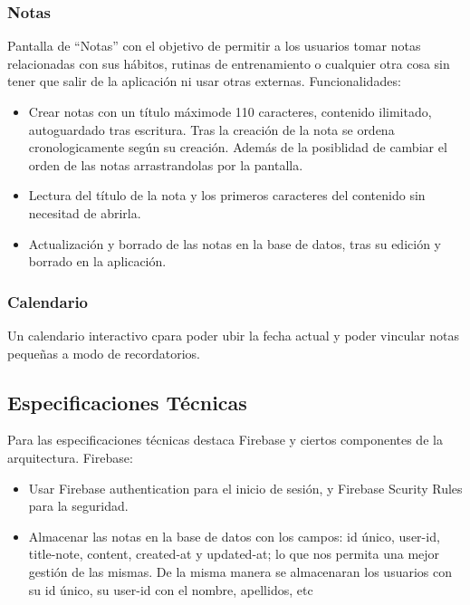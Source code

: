 \subsubsection{Notas}
Pantalla de ``Notas'' con el objetivo de permitir a los usuarios tomar notas relacionadas con sus hábitos, rutinas de entrenamiento o cualquier otra cosa sin tener que salir de la aplicación ni usar otras externas.
Funcionalidades:
\begin{itemize}
    \item Crear notas con un título máximode 110 caracteres, contenido ilimitado, autoguardado tras escritura.
    Tras la creación de la nota se ordena cronologicamente según su creación. Además de la posiblidad de cambiar el orden de las notas arrastrandolas por la pantalla.
    \item Lectura del título de la nota y los primeros caracteres del contenido sin necesitad de abrirla. 
    \item Actualización y borrado de las notas en la base de datos, tras su edición y borrado en la aplicación.
\end{itemize}

\subsubsection{Calendario}
Un calendario interactivo cpara poder ubir la fecha actual y poder vincular notas pequeñas a modo de recordatorios.

\subsection{Especificaciones Técnicas}

Para las especificaciones técnicas destaca Firebase y ciertos componentes de la arquitectura.
Firebase:
\begin{itemize}
    \item Usar Firebase authentication para el inicio de sesión, y Firebase Scurity Rules para la seguridad.
    \item Almacenar las notas en la base de datos con los campos: id único, user-id, title-note, content, created-at y updated-at; lo que nos permita una mejor gestión de las mismas.
    De la misma manera se almacenaran los usuarios con su id único, su user-id con el nombre, apellidos, etc
\end{itemize}

